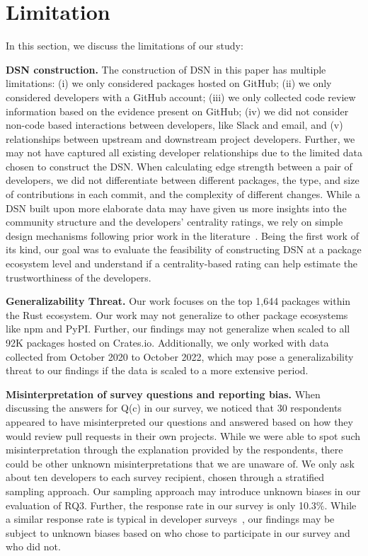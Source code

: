 \documentclass[10pt,journal,compsoc]{IEEEtran}
\begin{document}
\section{Limitation}
\label{limitation}

In this section, we discuss the limitations of our study:

\textbf{DSN construction.} The construction of DSN in this paper has multiple limitations: (i) we only considered packages hosted on GitHub; (ii) we only considered developers with a GitHub account; (iii) we only collected code review information based on the evidence present on GitHub; (iv) we did not consider non-code based interactions between developers, like Slack and email, and (v) relationships between upstream and downstream project developers. Further, we may not have captured all existing developer relationships due to the limited data chosen to construct the DSN. When calculating edge strength between a pair of developers, we did not differentiate between different packages, the type, and size of contributions in each commit, and the complexity of different changes. While a DSN built upon more elaborate data may have given us more insights into the community structure and the developers' centrality ratings, we rely on simple design mechanisms following prior work in the literature~\cite{herbold2021systematic}. Being the first work of its kind, our goal was to evaluate the feasibility of constructing DSN at a package ecosystem level and understand if a centrality-based rating can help estimate the trustworthiness of the developers.


\textbf{Generalizability Threat.} Our work focuses on the top 1,644 packages within the Rust ecosystem. Our work may not generalize to other package ecosystems like npm and PyPI. Further, our findings may not generalize when scaled to all 92K packages hosted on Crates.io. Additionally, we only worked with data collected from October 2020 to October 2022, which may pose a generalizability threat to our findings if the data is scaled to a more extensive period.

\textbf{Misinterpretation of survey questions and reporting bias.} When discussing the answers for Q(c) in our survey, we noticed that 30 respondents appeared to have misinterpreted our questions and answered based on how they would review pull requests in their own projects. While we were able to spot such misinterpretation through the explanation provided by the respondents, there could be other unknown misinterpretations that we are unaware of. 
We only ask about ten developers to each survey recipient, chosen through a stratified sampling approach.
Our sampling approach may introduce unknown biases in our evaluation of RQ3. 
Further, the response rate in our survey is only 10.3\%. While a similar response rate is typical in developer surveys~\cite{smith2013improving}, our findings may be subject to unknown biases based on who chose to participate in our survey and who did not. 
\end{document}
